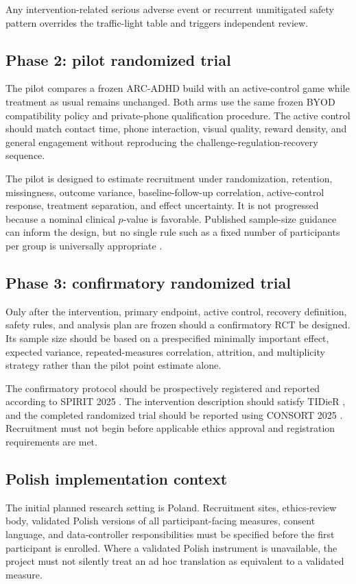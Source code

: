 Any intervention-related serious adverse event or recurrent unmitigated safety pattern overrides the traffic-light table and triggers independent review.

\subsection{Phase 2: pilot randomized trial}

The pilot compares a frozen ARC-ADHD build with an active-control game while treatment as usual remains unchanged. Both arms use the same frozen BYOD compatibility policy and private-phone qualification procedure. The active control should match contact time, phone interaction, visual quality, reward density, and general engagement without reproducing the challenge-regulation-recovery sequence.

The pilot is designed to estimate recruitment under randomization, retention, missingness, outcome variance, baseline-follow-up correlation, active-control response, treatment separation, and effect uncertainty. It is not progressed because a nominal clinical \(p\)-value is favorable. Published sample-size guidance can inform the design, but no single rule such as a fixed number of participants per group is universally appropriate \parencite{whitehead2016pilot}.

\subsection{Phase 3: confirmatory randomized trial}

Only after the intervention, primary endpoint, active control, recovery definition, safety rules, and analysis plan are frozen should a confirmatory RCT be designed. Its sample size should be based on a prespecified minimally important effect, expected variance, repeated-measures correlation, attrition, and multiplicity strategy rather than the pilot point estimate alone.

The confirmatory protocol should be prospectively registered and reported according to SPIRIT 2025 \parencite{chan2025spirit}. The intervention description should satisfy TIDieR \parencite{hoffmann2014tidier}, and the completed randomized trial should be reported using CONSORT 2025 \parencite{hopewell2025consort}. Recruitment must not begin before applicable ethics approval and registration requirements are met.

\subsection{Polish implementation context}

The initial planned research setting is Poland. Recruitment sites, ethics-review body, validated Polish versions of all participant-facing measures, consent language, and data-controller responsibilities must be specified before the first participant is enrolled. Where a validated Polish instrument is unavailable, the project must not silently treat an ad hoc translation as equivalent to a validated measure.
